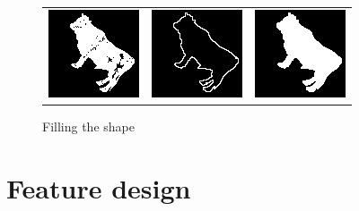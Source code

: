 \documentclass[a4paper, 11pt]{article}
\begin{document}
\begin{figure}[h!]
\centering
\begin{tabular}{ccc}
\includegraphics{normalize-1.png} &
\includegraphics{normalize-2.png} &
\includegraphics{normalize-3.png} \\
\end{tabular}
\caption{Filling the shape}
\end{figure}

\newpage
\section{Feature design}
\end{document}
